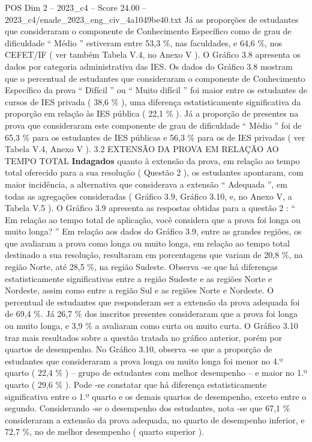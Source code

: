 \begin{textsample}{POS Dim 2 – 2023\_c4 – Score 24.00 – 2023\_c4/enade\_2023\_eng\_civ\_4a1049be40.txt}
Já as proporções de estudantes que consideraram o componente de Conhecimento Específico como de grau de dificuldade “ Médio ” estiveram entre 53,3 \%, nas faculdades, e 64,6 \%, nos CEFET/IF ( ver também Tabela V.4, no Anexo V ).
O Gráfico 3.8 apresenta os dados por categoria administrativa das IES.
Os dados do Gráfico 3.8 mostram que o percentual de estudantes que consideraram o componente de Conhecimento Específico da prova “ Difícil ” ou “ Muito difícil ” foi maior entre os estudantes de cursos de IES privada ( 38,6 \% ), uma diferença estatisticamente significativa da proporção em relação às IES pública ( 22,1 \% ).
Já a proporção de presentes na prova que consideraram este componente de grau de dificuldade “ Médio ” foi de 65,3 \% para os estudantes de IES públicas e 56,3 \% para os de IES privadas ( ver Tabela V.4, Anexo V ). 3.2 EXTENSÃO DA PROVA EM RELAÇÃO AO TEMPO TOTAL \textbf{Indagados} quanto à extensão da prova, em relação ao tempo total oferecido para a sua resolução ( Questão 2 ), os estudantes apontaram, com maior incidência, a alternativa que considerava a extensão “ Adequada ”, em todas as agregações consideradas ( Gráfico 3.9, Gráfico 3.10, e, no Anexo V, a Tabela V.5 ).
O Gráfico 3.9 apresenta as respostas obtidas para a questão 2 : “ Em relação ao tempo total de aplicação, você considera que a prova foi longa ou muito longa? ” Em relação aos dados do Gráfico 3.9, entre as grandes regiões, os que avaliaram a prova como longa ou muito longa, em relação ao tempo total destinado a sua resolução, resultaram em porcentagens que variam de 20,8 \%, na região Norte, até 28,5 \%, na região Sudeste.
Observa -se que há diferenças estatisticamente significativas entre a região Sudeste e as regiões Norte e Nordeste, assim como entre a região Sul e as regiões Norte e Nordeste.
O percentual de estudantes que responderam ser a extensão da prova adequada foi de 69,4 \%.
Já 26,7 \% dos inscritos presentes consideraram que a prova foi longa ou muito longa, e 3,9 \% a avaliaram como curta ou muito curta.
O Gráfico 3.10 traz mais resultados sobre a questão tratada no gráfico anterior, porém por quartos de desempenho.
No Gráfico 3.10, observa -se que a proporção de estudantes que consideraram a prova longa ou muito longa foi menor no 4.º quarto ( 22,4 \% ) – grupo de estudantes com melhor desempenho – e maior no 1.º quarto ( 29,6 \% ).
Pode -se constatar que há diferença estatisticamente significativa entre o 1.º quarto e os demais quartos de desempenho, exceto entre o segundo.
Considerando -se o desempenho dos estudantes, nota -se que 67,1 \% consideraram a extensão da prova adequada, no quarto de desempenho inferior, e 72,7 \%, no de melhor desempenho ( quarto superior ).

\end{textsample}
